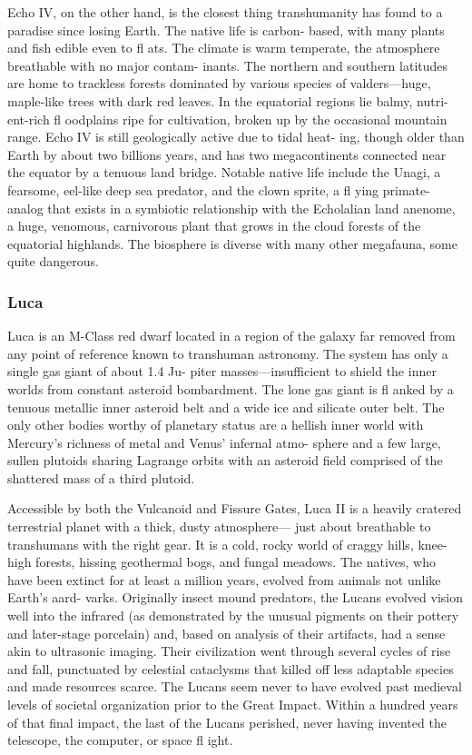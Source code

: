 Echo IV, on the other hand, is the closest thing transhumanity 
has found to a paradise since losing Earth. The native life is carbon-
based, with many plants and fish edible even to fl ats. The climate is 
warm temperate, the atmosphere breathable with no major contam-
inants. The northern and southern latitudes are home to trackless 
forests dominated by various species of valders—huge, maple-like 
trees with dark red leaves. In the equatorial regions lie balmy, nutri-
ent-rich fl oodplains ripe for cultivation, broken up by the occasional 
mountain range. Echo IV is still geologically active due to tidal heat-
ing, though older than Earth by about two billions years, and has 
two megacontinents connected near the equator by a tenuous land 
bridge. Notable native life include the Unagi, a fearsome, eel-like 
deep sea predator, and the clown sprite, a fl ying primate-analog that 
exists in a symbiotic relationship with the Echolalian land anenome, 
a huge, venomous, carnivorous plant that grows in the cloud forests 
of the equatorial highlands. The biosphere is diverse with many 
other megafauna, some quite dangerous.

\subsubsection{Luca}

Luca is an M-Class red dwarf located in a region of the galaxy 
far removed from any point of reference known to transhuman 
astronomy. The system has only a single gas giant of about 1.4 Ju-
piter masses—insufficient to shield the inner worlds from constant 
asteroid bombardment. The lone gas giant is fl anked by a tenuous 
metallic inner asteroid belt and a wide ice and silicate outer belt. 
The only other bodies worthy of planetary status are a hellish inner 
world with Mercury's richness of metal and Venus' infernal atmo-
sphere and a few large, sullen plutoids sharing Lagrange orbits with 
an asteroid field comprised of the shattered mass of a third plutoid.

Accessible by both the Vulcanoid and Fissure Gates, Luca II is a 
heavily cratered terrestrial planet with a thick, dusty atmosphere—
just about breathable to transhumans with the right gear. It is a cold, 
rocky world of craggy hills, knee-high forests, hissing geothermal 
bogs, and fungal meadows. The natives, who have been extinct for at 
least a million years, evolved from animals not unlike Earth's aard-
varks. Originally insect mound predators, the Lucans evolved vision 
well into the infrared (as demonstrated by the unusual pigments on 
their pottery and later-stage porcelain) and, based on analysis of their 
artifacts, had a sense akin to ultrasonic imaging. Their civilization 
went through several cycles of rise and fall, punctuated by celestial 
cataclysms that killed off less adaptable species and made resources 
scarce. The Lucans seem never to have evolved past medieval levels 
of societal organization prior to the Great Impact. Within a hundred 
years of that final impact, the last of the Lucans perished, never 
having invented the telescope, the computer, or space fl ight.

